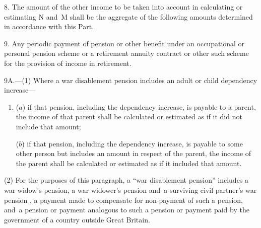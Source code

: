 \documentclass[12pt,a4paper]{article}
\begin{document}
\renewcommand\parthead{--- Schedule 1 Part III}

8.  The amount of the other income to be taken into account in calculating or estimating N and~M shall be the aggregate of the following amounts determined in accordance with this Part.

\medskip

9.  Any periodic payment of pension or other benefit under an occupational or personal pension scheme or a retirement annuity contract or other such scheme for the provision of income in retirement.

\medskip

9A.—(1) Where a war disablement pension includes an adult or child dependency increase—
\begin{enumerate}\item[]
($a$) if that pension, including the dependency increase, is payable to a parent, the income of that parent shall be calculated or estimated as if it did not include that amount;

($b$) if that pension, including the dependency increase, is payable to some other person but includes an amount in respect of the parent, the income of the parent shall be calculated or estimated as if it included that amount.
\end{enumerate}

(2) For the purposes of this paragraph, a “war disablement pension” includes 
a war widow’s pension, a war widower’s pension and~a surviving civil partner’s war pension%
, a payment made to compensate for non-payment of such a pension, and~a pension or payment analogous to such a pension or payment paid by the government of a country outside Great Britain.

\end{document}
